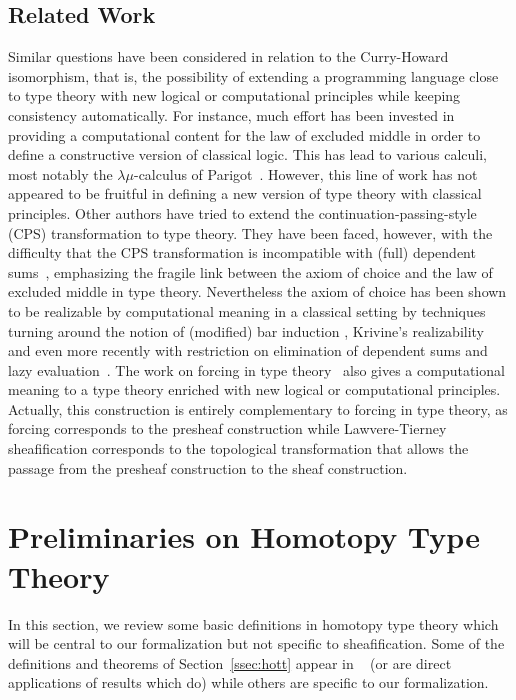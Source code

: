 \documentclass[notfinal]{jfrarticle}
\begin{document}
\subsection*{Related Work}

Similar questions have been considered in relation to the Curry-Howard
isomorphism, that is, the possibility of extending a programming
language close to type theory with new logical or computational
principles while keeping consistency automatically.
%
For instance, much effort has been invested in providing a computational
content for the law of excluded middle in order to define a
constructive version of classical logic. This has lead to various
calculi, most notably the $\lambda \mu$-calculus of
Parigot~\cite{parigot1993classical}. However, this line of work has not
appeared to be fruitful in defining a new version of type theory with
classical principles.
%
Other authors have tried to extend the continuation-passing-style (CPS)
transformation to type theory.  They have been faced, however, with the
difficulty that the CPS transformation is incompatible with (full) dependent
sums~\cite{barthe2002cps}, emphasizing the fragile link
between the axiom of choice and the law of excluded middle in type theory.
%
Nevertheless the axiom of choice has been shown to be realizable by
computational meaning in a classical setting by techniques turning
around the notion of (modified) bar induction
\cite{berardi1998computational}, Krivine's
realizability~\cite{krivine2003dependent} and even more recently with
restriction on elimination of dependent sums and lazy
evaluation~\cite{herbelin2012constructive}.
The work on forcing in type theory~\cite{jaber2012extending,forcing2016} also
gives a computational meaning to a type theory enriched with new
logical or computational principles.
%
Actually, this construction is entirely complementary to
forcing in type theory, as forcing corresponds to the presheaf
construction while Lawvere-Tierney sheafification corresponds to the
topological transformation that allows the passage from the presheaf
construction to the sheaf construction.




\section{Preliminaries on Homotopy Type Theory}
\label{sec:hott}

In this section, we review some basic definitions in homotopy type
theory which will be central to our formalization but not specific to
sheafification. 
Some of the definitions and theorems of Section~\ref{ssec:hott} appear
in ~\cite{hottbook} (or are direct applications of results which do)
while others are specific to our formalization.
\end{document}
